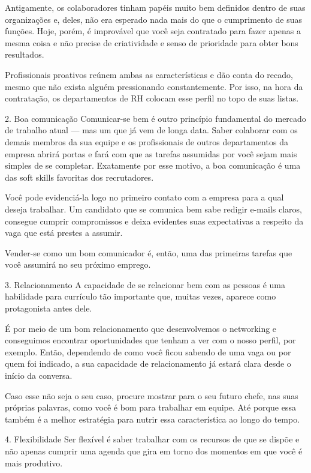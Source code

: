 \begin{commentA}
Antigamente, os colaboradores tinham papéis muito bem definidos dentro de suas organizações e, deles, não era esperado nada mais do que o cumprimento de suas funções. Hoje, porém, é improvável que você seja contratado para fazer apenas a mesma coisa e não precise de criatividade e senso de prioridade para obter bons resultados.

Profissionais proativos reúnem ambas as características e dão conta do recado, mesmo que não exista alguém pressionando constantemente. Por isso, na hora da contratação, os departamentos de RH colocam esse perfil no topo de suas listas.

2. Boa comunicação
Comunicar-se bem é outro princípio fundamental do mercado de trabalho atual — mas um que já vem de longa data. Saber colaborar com os demais membros da sua equipe e os profissionais de outros departamentos da empresa abrirá portas e fará com que as tarefas assumidas por você sejam mais simples de se completar. Exatamente por esse motivo, a boa comunicação é uma das soft skills favoritas dos recrutadores.

Você pode evidenciá-la logo no primeiro contato com a empresa para a qual deseja trabalhar. Um candidato que se comunica bem sabe redigir e-mails claros, consegue cumprir compromissos e deixa evidentes suas expectativas a respeito da vaga que está prestes a assumir.

Vender-se como um bom comunicador é, então, uma das primeiras tarefas que você assumirá no seu próximo emprego.

3. Relacionamento
A capacidade de se relacionar bem com as pessoas é uma habilidade para currículo tão importante que, muitas vezes, aparece como protagonista antes dele.

É por meio de um bom relacionamento que desenvolvemos o networking e conseguimos encontrar oportunidades que tenham a ver com o nosso perfil, por exemplo. Então, dependendo de como você ficou sabendo de uma vaga ou por quem foi indicado, a sua capacidade de relacionamento já estará clara desde o início da conversa.

Caso esse não seja o seu caso, procure mostrar para o seu futuro chefe, nas suas próprias palavras, como você é bom para trabalhar em equipe. Até porque essa também é a melhor estratégia para nutrir essa característica ao longo do tempo.

4. Flexibilidade
Ser flexível é saber trabalhar com os recursos de que se dispõe e não apenas cumprir uma agenda que gira em torno dos momentos em que você é mais produtivo.


\end{commentA}
